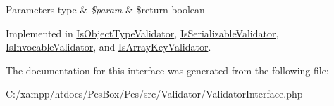 \begin{DoxyParams}[1]{Parameters}
type & {\em \$param} & \$return boolean \\
\hline
\end{DoxyParams}


Implemented in \mbox{\hyperlink{class_pes_1_1_validator_1_1_is_object_type_validator_a250dbda694ce9c4d0dd4e71e1df35882}{Is\+Object\+Type\+Validator}}, \mbox{\hyperlink{class_pes_1_1_validator_1_1_is_serializable_validator_a250dbda694ce9c4d0dd4e71e1df35882}{Is\+Serializable\+Validator}}, \mbox{\hyperlink{class_pes_1_1_validator_1_1_is_invocable_validator_a250dbda694ce9c4d0dd4e71e1df35882}{Is\+Invocable\+Validator}}, and \mbox{\hyperlink{class_pes_1_1_validator_1_1_is_array_key_validator_a250dbda694ce9c4d0dd4e71e1df35882}{Is\+Array\+Key\+Validator}}.



The documentation for this interface was generated from the following file\+:\begin{DoxyCompactItemize}
\item 
C\+:/xampp/htdocs/\+Pes\+Box/\+Pes/src/\+Validator/Validator\+Interface.\+php\end{DoxyCompactItemize}
